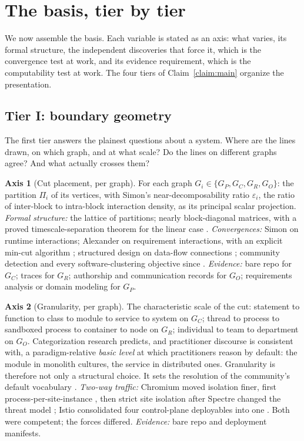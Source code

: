 \documentclass[11pt,oneside]{article}
\theoremstyle{definition}
\newtheorem{axis}{Axis}
\begin{document}
\section{The basis, tier by tier}\label{sec:basis}

We now assemble the basis. Each variable is stated as an axis: what varies, its formal
structure, the independent discoveries that force it, which is the convergence test at work, and
its evidence requirement, which is the computability test at work. The four tiers of
Claim~\ref{claim:main} organize the presentation.

\subsection{Tier I: boundary geometry}

The first tier answers the plainest questions about a system. Where are the lines drawn, on
which graph, and at what scale? Do the lines on different graphs agree? And what actually
crosses them?

\begin{axis}[Cut placement, per graph]\label{ax:cut}
For each graph $G_i \in \{G_P, G_C, G_R, G_O\}$: the partition $\Pi_i$ of its vertices, with
Simon's near-decomposability ratio $\varepsilon_i$, the ratio of inter-block to intra-block
interaction density, as its principal scalar projection. \emph{Formal structure:} the lattice of
partitions; nearly block-diagonal matrices, with a proved timescale-separation theorem for the
linear case \cite{simonando1961}. \emph{Convergences:} Simon on runtime interactions; Alexander
on requirement interactions, with an explicit min-cut algorithm \cite{alexander1964}; structured
design on data-flow connections \cite{stevens1974}; community detection and every
software-clustering objective since \cite{mancoridis1999}. \emph{Evidence:} bare repo for
$G_C$; traces for $G_R$; authorship and communication records for $G_O$; requirements analysis
or domain modeling for $G_P$.
\end{axis}

\begin{axis}[Granularity, per graph]\label{ax:granularity}
The characteristic scale of the cut: statement to function to class to module to service to
system on $G_C$; thread to process to sandboxed process to container to node on $G_R$;
individual to team to department on $G_O$. Categorization research predicts, and practitioner
discourse is consistent with, a paradigm-relative \emph{basic level} at which practitioners
reason by default: the module in monolith cultures, the service in distributed ones. Granularity
is therefore not only a structural choice. It sets the resolution of the community's default
vocabulary \cite{rosch1978,gardenfors2000}. \emph{Two-way traffic:} Chromium moved isolation
finer, first process-per-site-instance \cite{chromium2009}, then strict site isolation after
Spectre changed the threat model \cite{reis2019}; Istio consolidated four control-plane
deployables into one \cite{istio2020}. Both were competent; the forces differed.
\emph{Evidence:} bare repo and deployment manifests.
\end{axis}
\end{document}
